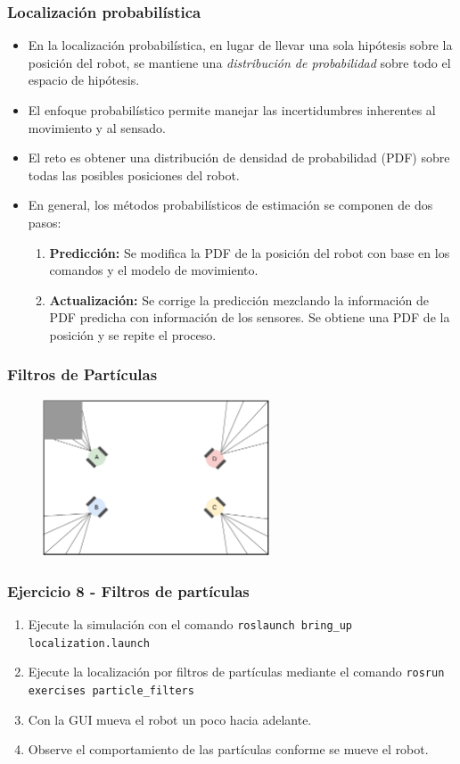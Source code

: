 \begin{frame}\frametitle{Localización probabilística}
  \begin{itemize}
  \item En la localización probabilística, en lugar de llevar una sola hipótesis sobre la posición del robot, se mantiene una \textit{distribución de probabilidad} sobre todo el espacio de hipótesis.
  \item El enfoque probabilístico permite manejar las incertidumbres inherentes al movimiento y al sensado.
  \item El reto es obtener una distribución de densidad de probabilidad (PDF) sobre todas las posibles posiciones del robot.
  \item En general, los métodos probabilísticos de estimación se componen de dos pasos:
    \begin{enumerate}
    \item \textbf{Predicción:} Se modifica la PDF de la posición del robot con base en los comandos y el modelo de movimiento.
    \item \textbf{Actualización:} Se corrige la predicción mezclando la información de PDF predicha con información de los sensores. Se obtiene una PDF de la posición y se repite el proceso. 
    \end{enumerate}
  \end{itemize}
  
\end{frame}

\begin{frame}\frametitle{Filtros de Partículas}
  \begin{figure}
    \centering
    \includegraphics[width=0.6\textwidth]{Figures/ParticleFilter1.pdf}
  \end{figure}
\end{frame}

\begin{frame}[containsverbatim]\frametitle{Ejercicio 8 - Filtros de partículas}
  \begin{enumerate}
  \item Ejecute la simulación con el comando \texttt{roslaunch bring\_up localization.launch}
  \item Ejecute la localización por filtros de partículas mediante el comando \texttt{rosrun exercises particle\_filters}
  \item Con la GUI mueva el robot un poco hacia adelante. 
  \item Observe el comportamiento de las partículas conforme se mueve el robot. 
  \end{enumerate}
\end{frame}
